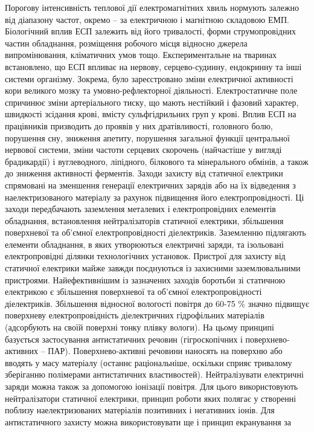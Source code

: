 \documentclass[14pt]{extarticle} %
\begin{document}
Порогову інтенсивність теплової дії електромагнітних хвиль нормують залежно від
діапазону частот, окремо -- за електричною і магнітною складовою ЕМП.
Біологічний вплив ЕСП залежить від його тривалості, форми струмопровідних
частин обладнання, розміщення робочого місця відносно джерела випромінювання,
кліматичних умов тощо. Експериментальне на тваринах встановлено, що ЕСП впливає
на нервову, серцево-судинну, ендокринну та інші системи організму. Зокрема,
було зареєстровано зміни електричної активності кори великого мозку та
умовно-рефлекторної діяльності. Електростатичне поле спричинює зміни
артеріального тиску, що мають нестійкий і фазовий характер, швидкості зсідання
крові, вмісту сульфгідрильних груп у крові.
Вплив ЕСП на працівників призводить до проявів у них дратівливості, головного
болю, порушення сну, зниження 
апетиту, порушення загальної функції центральної нервової системи, зміни
частоти серцевих скорочень 
(найчастіше у вигляді брадикардії) і вуглеводного, ліпідного, білкового та
мінерального обмінів, а також до зниження активності ферментів.
Заходи захисту від статичної електрики спрямовані на зменшення генерації
електричних зарядів або на їх відведення з наелектризованого матеріалу за
рахунок підвищення його електропровідності. Ці заходи передбачають заземлення
металевих і електропровідних елементів обладнання, встановлення нейтралізаторів
статичної електрики, збільшення поверхневої та об'ємної електропровідності
діелектриків. Заземленню підлягають елементи обладнання, в яких утворюються
електричні заряди, та ізольовані електропровідні ділянки технологічних
установок. Пристрої для захисту від статичної електрики майже завжди
поєднуються із захисними заземлювальними пристроями.
Найефективнішим із зазначених заходів боротьби зі статичною електрикою є
збільшення поверхневої та об'ємної електропровідності
діелектриків. Збільшення відносної вологості повітря до 60-75 \% значно
підвищує поверхневу електропровідність діелектричних гідрофільних матеріалів
(адсорбують на своїй поверхні тонку плівку вологи). На цьому принципі базується
застосування антистатичних речовин (гігроскопічних і поверхнево-активних --
ПАР). Поверхнево-активні речовини наносять на поверхню або вводять у масу
матеріалу (останнє раціональніше, оскільки сприяє тривалому зберіганню
полімерами антистатичних властивостей).
Нейтралізувати електричні заряди можна також за допомогою іонізації повітря.
Для цього використовують нейтралізатори статичної електрики, принцип роботи
яких полягає у створенні поблизу наелектризованих матеріалів позитивних і
негативних іонів.
Для антистатичного захисту можна використовувати ще і принцип екранування за
\end{document}

